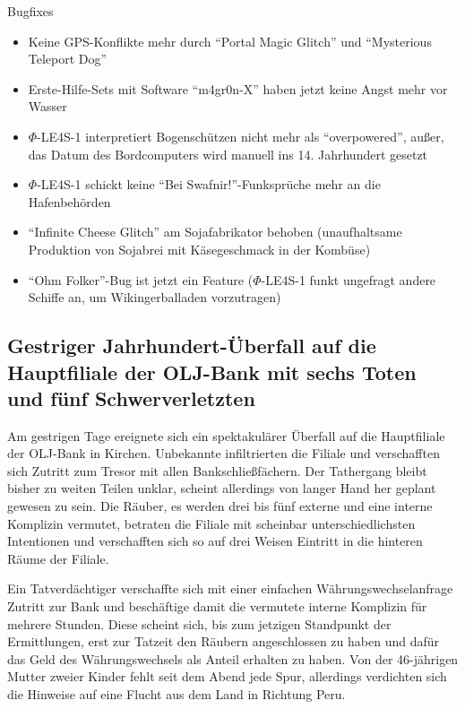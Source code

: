 \documentclass[final]{multiversum}
\begin{document}
\noindent Bugfixes
\begin{itemize}
    \item Keine GPS-Konflikte mehr durch \enquote{Portal Magic Glitch} und \enquote{Mysterious Teleport Dog}
    \item Erste-Hilfe-Sets mit Software \enquote{m4gr0n-X} haben jetzt keine Angst mehr
    vor Wasser
    \item $\Phi$-LE4S-1 interpretiert Bogenschützen nicht mehr als
    \enquote{overpowered}, außer, das Datum des Bordcomputers wird manuell ins 14.
    Jahrhundert gesetzt
    \item $\Phi$-LE4S-1 schickt keine \enquote{Bei Swafnir!}-Funksprüche mehr an die
    Hafenbehörden
    \item \enquote{Infinite Cheese Glitch} am Sojafabrikator behoben
    (unaufhaltsame Produktion von Sojabrei mit Käsegeschmack in der Kombüse)
    \item \enquote{Ohm Folker}-Bug ist jetzt ein Feature ($\Phi$-LE4S-1 funkt
    ungefragt andere Schiffe an, um Wikingerballaden vorzutragen)
\end{itemize} 

\subsection{Gestriger Jahrhundert-Überfall auf die Hauptfiliale der OLJ-Bank mit sechs Toten und fünf Schwerverletzten}
Am gestrigen Tage ereignete sich ein spektakulärer Überfall auf die Hauptfiliale
der OLJ-Bank in Kirchen. Unbekannte infiltrierten die Filiale und verschafften
sich Zutritt zum Tresor mit allen Bankschließfächern. Der Tathergang bleibt
bisher zu weiten Teilen unklar, scheint allerdings von langer Hand her geplant
gewesen zu sein. Die Räuber, es werden drei bis fünf externe und eine interne Komplizin
vermutet, betraten die Filiale mit scheinbar unterschiedlichsten Intentionen und
verschafften sich so auf drei Weisen Eintritt in die hinteren Räume der Filiale.

Ein Tatverdächtiger verschaffte sich mit einer einfachen Währungswechselanfrage
Zutritt zur Bank und beschäftige damit die vermutete interne Komplizin für
mehrere Stunden. Diese scheint sich, bis zum jetzigen Standpunkt der
Ermittlungen, erst zur Tatzeit den Räubern angeschlossen zu haben und dafür das
Geld des Währungswechsels als Anteil erhalten zu haben. Von der 46-jährigen
Mutter zweier Kinder fehlt seit dem Abend jede Spur, allerdings verdichten sich
die Hinweise auf eine Flucht aus dem Land in Richtung Peru.
\end{document}

